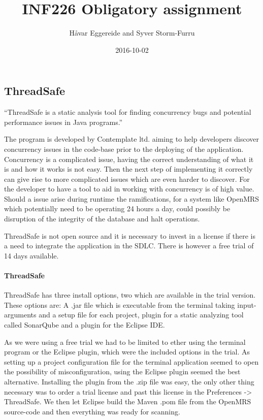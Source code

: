 \documentclass{report} %
\title{INF226 Obligatory assignment}
\date{2016-10-02}
\author{Håvar Eggereide and Syver Storm-Furru}
\begin{document}
\maketitle
{}
\newpage
{}
\tableofcontents
\newpage
\subsection{ThreadSafe} %

``ThreadSafe is a static analysis tool for finding concurrency bugs and
potential performance issues in Java programs.''
 \autocite[]{THREADSAFE}

The program is developed by Contemplate ltd. aiming to help developers discover
concurrency issues in the code-base prior to the deploying of the application.
Concurrency is a complicated issue, having the correct understanding of
what it is and how it works is not easy. Then the next step
of implementing it correctly can give rise to more complicated issues which are
even harder to discover. For the developer to have a tool to aid in working with
concurrency is of high value. Should a issue arise during runtime the
ramifications, for a system like OpenMRS which potentially need to be operating
24 hours a day, could possibly be disruption of the integrity of the database
and halt operations.

ThreadSafe is not open source and it is necessary to invest in a license if
there is a need to integrate the application in the SDLC. There is however a
free trial of 14 days available.

\paragraph{ThreadSafe} %

ThreadSafe has three install options, two which are available in the trial
version. These options are: A .jar file which is executable from the terminal
taking input-arguments and a setup file for each project, plugin for a static
analyzing tool called SonarQube and a plugin for the Eclipse IDE.

As we were using a free trial we had to be limited to ether using the terminal
program or the Eclipse plugin, which were the included options in the trial. As
setting up a project configuration file for the terminal application seemed to
open the possibility of misconfiguration, using the Eclipse plugin seemed the
best alternative. Installing the plugin from the .zip file was easy, the only
other thing necessary was to order a trial license and past this license in the
Preferences -> ThreadSafe. We then let Eclipse build the Maven .pom file from
the OpenMRS source-code and then everything was ready for scanning. 
\end{document}
